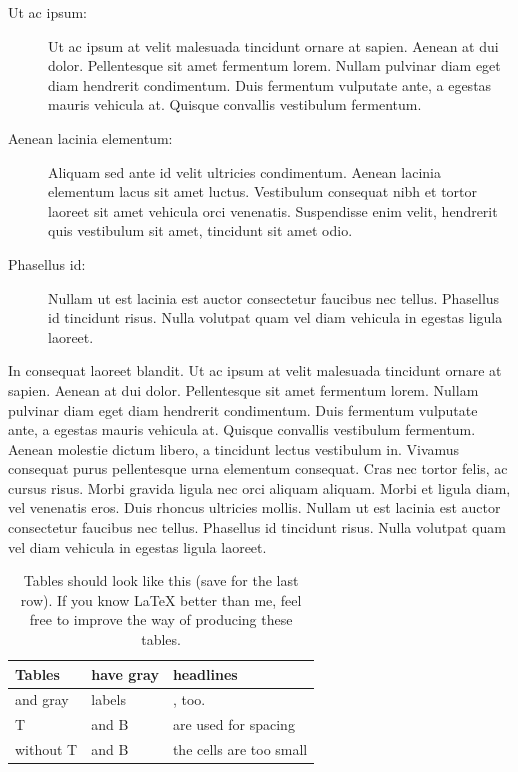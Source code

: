 \begin{description}
\item[Ut ac ipsum:]
Ut ac ipsum at velit malesuada tincidunt ornare at sapien. Aenean at dui dolor. Pellentesque sit amet fermentum lorem. Nullam pulvinar diam eget diam hendrerit condimentum. Duis fermentum vulputate ante, a egestas mauris vehicula at. Quisque convallis vestibulum fermentum.

\item[Aenean lacinia elementum:]
Aliquam sed ante id velit ultricies condimentum. Aenean lacinia elementum lacus sit amet luctus. Vestibulum consequat nibh et tortor laoreet sit amet vehicula orci venenatis. Suspendisse enim velit, hendrerit quis vestibulum sit amet, tincidunt sit amet odio.

\item[Phasellus id:]
Nullam ut est lacinia est auctor consectetur faucibus nec tellus. Phasellus id tincidunt risus. Nulla volutpat quam vel diam vehicula in egestas ligula laoreet.

\end{description}

In consequat laoreet blandit. Ut ac ipsum at velit malesuada tincidunt ornare at sapien. Aenean at dui dolor. Pellentesque sit amet fermentum lorem. Nullam pulvinar diam eget diam hendrerit condimentum. Duis fermentum vulputate ante, a egestas mauris vehicula at. Quisque convallis vestibulum fermentum. Aenean molestie dictum libero, a tincidunt lectus vestibulum in. Vivamus consequat purus pellentesque urna elementum consequat. Cras nec tortor felis, ac cursus risus. Morbi gravida ligula nec orci aliquam aliquam. Morbi et ligula diam, vel venenatis eros. Duis rhoncus ultricies mollis. Nullam ut est lacinia est auctor consectetur faucibus nec tellus. Phasellus id tincidunt risus. Nulla volutpat quam vel diam vehicula in egestas ligula laoreet.

\begin{table}[b]
\caption{Tables should look like this (save for the last row). If you know LaTeX better than me, feel free to improve the way of producing these tables.}
\begin{tabularx}{\linewidth}{|l|X|X|}
\hline
\rowcolor{slightgray}
\T Tables	&have gray  &headlines\\
\hline
\cellcolor{slightgray}\T and gray &labels \B&, too.\\
\hline
\cellcolor{slightgray}\T T &and B& are used for spacing\B\\
\hline
\cellcolor{slightgray} without T & and B& the cells are too small\B\\
\hline 
\end{tabularx}
\label{tab:example}
\end{table}

